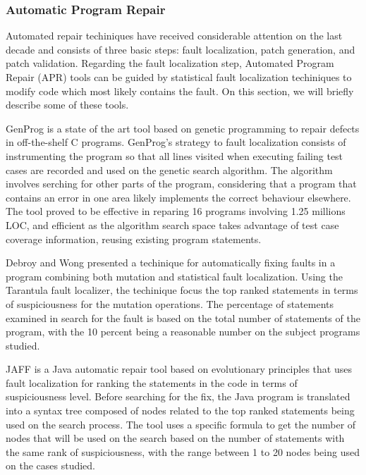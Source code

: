 \documentclass{article}
\begin{document}
\subsubsection{Automatic Program Repair}
Automated repair techiniques have received considerable attention on
the last decade and consists of three basic steps: fault localization, patch
generation, and patch validation.  Regarding the fault localization
step, Automated Program Repair (APR) tools can be guided by statistical
fault localization techiniques to modify code which most likely
contains the fault. On this section, we will briefly describe some of
these tools.

GenProg is a state of the art tool based on genetic
programming to repair defects in off-the-shelf C programs. GenProg's
strategy to fault localization consists of instrumenting the program
so that all lines visited when executing failing test cases are
recorded and used on the genetic search algorithm. The algorithm
involves serching for other parts of the program, considering that a
program that contains an error in one area likely implements the
correct behaviour elsewhere. The tool proved to be effective in
reparing 16 programs involving 1.25 millions LOC, and efficient as the
algorithm search space takes advantage of test case coverage
information, reusing  existing program statements.

Debroy and Wong presented a techinique for automatically
fixing faults in a program combining both mutation and statistical
fault localization. Using the Tarantula fault localizer, the
techinique focus the top ranked statements in terms of suspiciousness
for the mutation operations. The percentage of statements examined in
search for the fault is based on the total number of statements of the
program, with the 10 percent being a reasonable number on the subject
programs studied.

JAFF is a Java automatic repair tool based on evolutionary principles that uses fault localization for ranking the statements in the code in terms of suspiciousness level.
Before searching for the fix, the Java program is translated into a syntax tree composed of nodes related to the top ranked statements being used on the search process.
The tool uses a specific formula to get the number of nodes that will be used on the search based on the number of statements with the same rank of suspiciousness,
with the range between 1 to 20 nodes being used on the cases studied.
\end{document}
